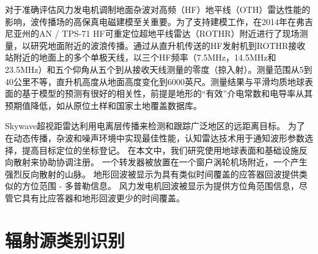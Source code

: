 对于准确评估风力发电机调制地面杂波对高频（HF）地平线（OTH）雷达性能的影响，波传播场的高保真电磁建模至关重要\cite{coutts2015low}。为了支持建模工作，在2014年在弗吉尼亚州的AN / TPS-71 HF可重定位超地平线雷达（ROTHR）附近进行了现场测量，以研究地面附近的波浪传播。通过从直升机传送的HF发射机到ROTHR接收站附近的地面上的多个单极天线，以三个HF频率（7.5MHz，14.5MHz和23.5MHz）和五个仰角从五个到从接收天线测量的零度（掠入射）。测量范围从5到40公里不等，直升机高度从地面高度变化到6000英尺。测量结果与平滑均质地球表面的基于模型的预测有很好的相关性，前提是地形的“有效”介电常数和电导率从其预期值降低，如从原位土样和国家土地覆盖数据库。


Skywave超视距雷达利用电离层传播来检测和跟踪广泛地区的远距离目标\cite{holdsworth2017skywave}。 为了在动态传播，杂波和噪声环境中实现最佳性能，认知雷达技术用于通知波形参数选择，提高目标定位的坐标登记。 在本文中，我们研究使用地球表面和基础设施反向散射来协助协调注册。 一个转发器被放置在一个窗户涡轮机场附近，一个产生强烈反向散射的山脉。 地形回波被显示为具有类似时间覆盖的应答器回波提供类似的方位范围 - 多普勒信息。 风力发电机回波被显示为提供方位角范围信息，尽管它具有比应答器和地形回波更少的时间覆盖。
\section{辐射源类别识别}

